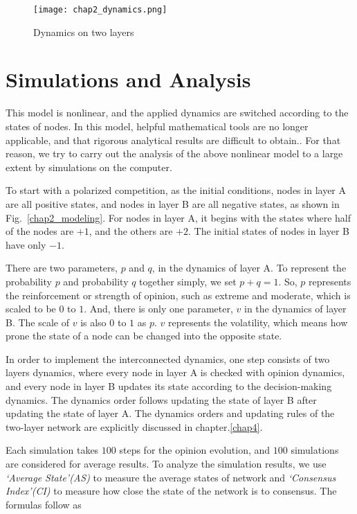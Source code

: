 \begin{figure}[!htb]
	\centering
	\texttt{[image: chap2\_dynamics.png]}
	\caption{Dynamics on two layers}
	\label{chap2_dynamics}
\end{figure}

\section{Simulations and Analysis}
This model is nonlinear, and the applied dynamics are switched according to the states of nodes. In this model, helpful mathematical tools are no longer applicable, and that rigorous analytical results are difficult to obtain.\parencite{nicolas2017, rainer2002}. For that reason, we try to carry out the analysis of the above nonlinear model to a large extent by simulations on the computer.

To start with a polarized competition, as the initial conditions,  nodes in layer A are all positive states, and nodes in layer B are all negative states, as shown in Fig.~\ref{chap2_modeling}. For nodes in layer A, it begins with the states where half of the nodes are $+1$, and the others are $+2$. The initial states of nodes in layer B have only $-1$.

There are two parameters, $p$ and $q$, in the dynamics of layer A. To represent the probability $p$ and probability $q$ together simply, we set $p+q=1$. So, $p$ represents the reinforcement or strength of opinion, such as extreme and moderate, which is scaled to be $0$ to $1$. And, there is only one parameter, $v$ in the dynamics of layer B. The scale of $v$ is also $0$ to $1$ as $p$. $v$ represents the volatility, which means how prone the state of a node can be changed into the opposite state.

In order to implement the interconnected dynamics, one step consists of two layers dynamics, where every node in layer A is checked with opinion dynamics, and every node in layer B updates its state according to the decision-making dynamics. The dynamics order follows updating the state of layer B after updating the state of layer A. The dynamics orders and updating rules of the two-layer network are explicitly discussed in chapter.\ref{chap4}.     

Each simulation takes $100$ steps for the opinion evolution, and $100$ simulations are considered for average results. To analyze the simulation results, we use \textit{`Average State'(AS)} to measure the average states of network and \textit{`Consensus Index'(CI)} to measure how close the state of the network is to consensus. The formulas follow as

